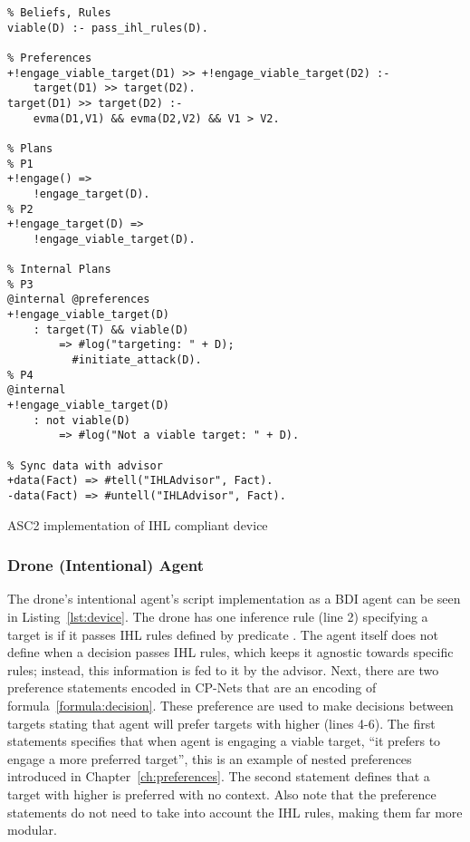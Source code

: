 

\begin{listing}
\centering
\begin{tcolorbox}[left=2pt,right=2pt,top=2pt,bottom=2pt,arc=0pt,
                  boxrule=0pt,toprule=1pt,
                  colback=white]
\begin{verbatim}
% Beliefs, Rules
viable(D) :- pass_ihl_rules(D).

% Preferences
+!engage_viable_target(D1) >> +!engage_viable_target(D2) :-
    target(D1) >> target(D2).
target(D1) >> target(D2) :- 
    evma(D1,V1) && evma(D2,V2) && V1 > V2.

% Plans
% P1
+!engage() =>
    !engage_target(D).
% P2
+!engage_target(D) =>
    !engage_viable_target(D).

% Internal Plans
% P3
@internal @preferences
+!engage_viable_target(D)
    : target(T) && viable(D)
        => #log("targeting: " + D);
          #initiate_attack(D).
% P4
@internal
+!engage_viable_target(D)
    : not viable(D)
        => #log("Not a viable target: " + D).

% Sync data with advisor
+data(Fact) => #tell("IHLAdvisor", Fact).
-data(Fact) => #untell("IHLAdvisor", Fact).
\end{verbatim}
\end{tcolorbox}
\caption{ASC2 implementation of IHL compliant device}
\label{lst:device}
\end{listing}


\subsubsection{Drone (Intentional) Agent}
The drone's intentional agent's script implementation as a BDI agent can be seen in Listing~\ref{lst:device}. The drone has one inference rule (line 2) specifying a target is  if it passes IHL rules defined by predicate . The agent itself does not define when a decision passes IHL rules, which keeps it agnostic towards specific rules; instead, this information is fed to it by the advisor. Next, there are two preference statements encoded in CP-Nets that are an encoding of formula~\ref{formula:decision}. These preference are used to make decisions between targets stating that agent will prefer targets with higher  (lines 4-6). The first statements specifies that when agent is engaging a viable target, ``it prefers to engage a more preferred target'', this is an example of nested preferences introduced in Chapter~\ref{ch:preferences}. The second statement defines that a target with higher  is preferred with no context. Also note that the preference statements do not need to take into account the IHL rules, making them far more modular. 

